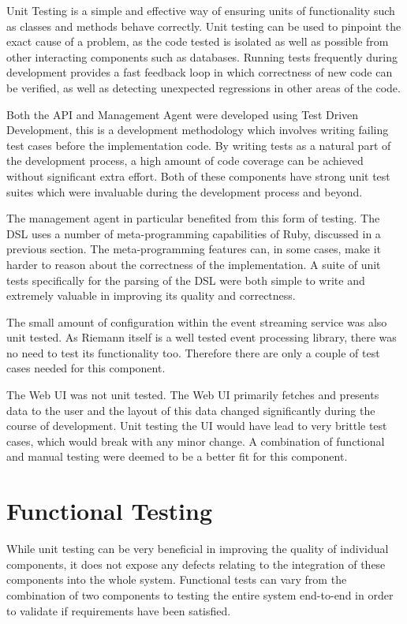 \documentclass{cshonours}
\begin{document}
Unit Testing is a simple and effective way of ensuring units of functionality such as classes and methods behave correctly. Unit testing can be used to pinpoint the exact cause of a problem, as the code tested is isolated as well as possible from other interacting components such as databases. Running tests frequently during development provides a fast feedback loop in which correctness of new code can be verified, as well as detecting unexpected regressions in other areas of the code.

Both the API and Management Agent were developed using Test Driven Development, this is a development methodology which involves writing failing test cases before the implementation code. By writing tests as a natural part of the development process, a high amount of code coverage can be achieved without significant extra effort. Both of these components have strong unit test suites which were invaluable during the development process and beyond.

The management agent in particular benefited from this form of testing. The DSL uses a number of meta-programming capabilities of Ruby, discussed in a previous section. The meta-programming features can, in some cases, make it harder to reason about the correctness of the implementation. A suite of unit tests specifically for the parsing of the DSL were both simple to write and extremely valuable in improving its quality and correctness.

The small amount of configuration within the event streaming service was also unit tested. As Riemann itself is a well tested event processing library, there was no need to test its functionality too. Therefore there are only a couple of test cases needed for this component.

The Web UI was not unit tested. The Web UI primarily fetches and presents data to the user and the layout of this data changed significantly during the course of development. Unit testing the UI would have lead to very brittle test cases, which would break with any minor change. A combination of functional and manual testing were deemed to be a better fit for this component.

\section{Functional Testing}

While unit testing can be very beneficial in improving the quality of individual components, it does not expose any defects relating to the integration of these components into the whole system. Functional tests can vary from the combination of two components to testing the entire system end-to-end in order to validate if requirements have been satisfied.
\end{document}
